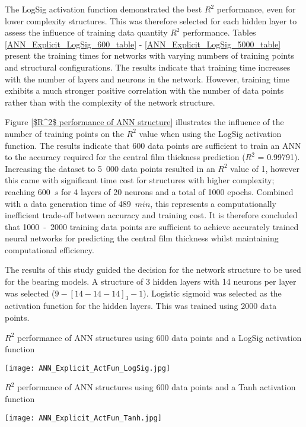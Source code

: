The LogSig activation function demonstrated the best $R^2$ performance, even for lower complexity structures. This was therefore selected for each hidden layer to assess the influence of training data quantity $R^2$ performance. Tables \ref{ANN_Explicit_LogSig_600_table} - \ref{ANN_Explicit_LogSig_5000_table} present the training times for networks with varying numbers of training points and structural configurations. The results indicate that training time increases with the number of layers and neurons in the network. However, training time exhibits a much stronger positive correlation with the number of data points rather than with the complexity of the network structure.

Figure \ref{$R^2$ performance of ANN structure} illustrates the influence of the number of training points on the $R^2$ value when using the LogSig activation function. The results indicate that 600 data points are sufficient to train an ANN to the accuracy required for the central film thickness prediction ($R^2$ = 0.99791). Increasing the dataset to 5~000 data points resulted in an $R^2$ value of 1, however this came with significant time cost for structures with higher complexity; reaching 600~$s$ for 4 layers of 20 neurons and a total of 1000 epochs. Combined with a data generation time of 489~$min$, this represents a computationally inefficient trade-off between accuracy and training cost. It is therefore concluded that 1000~-~2000 training data points are sufficient to achieve accurately trained neural networks for predicting the central film thickness whilst maintaining computational efficiency.

The results of this study guided the decision for the network structure to be used for the bearing models. A structure of 3 hidden layers with 14 neurons per layer was selected ($9-[14-14-14]_3-1$). Logistic sigmoid was selected as the activation function for the hidden layers. This was trained using 2000 data points.

\begin{table}
	\caption{$R^2$ performance of ANN structures using 600 data points and a LogSig activation function}
	\label{LogSig_table}
	\texttt{[image: ANN\_Explicit\_ActFun\_LogSig.jpg]}
\end{table}

\begin{table}
	\caption{$R^2$ performance of ANN structures using 600 data points and a Tanh activation function}
	\label{Tanh_table}
	\texttt{[image: ANN\_Explicit\_ActFun\_Tanh.jpg]}
\end{table}

